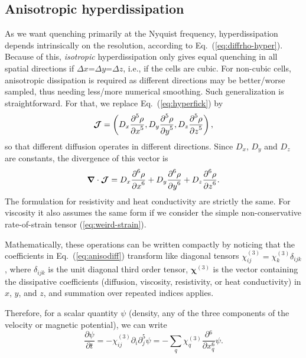 \documentclass[\mydriver,12pt,twoside,notitlepage,a4paper]{article}
\renewcommand{\vec}[1]{\mbox{\boldmath{$#1$}}}
\newcommand{\Div}     {\vec{\nabla}\cdot}
\newcommand{\pderiv}[2]{\frac{\partial #1}{\partial #2}}
\newcommand{\pderivn}[3]{\frac{{\partial{}}^{#3} #1}{{\partial #2}^{#3}}}
\begin{document}
\subsection{Anisotropic hyperdissipation}

As we want quenching primarily at the Nyquist frequency, hyperdissipation
depends intrinsically on the resolution, according to
Eq.~(\ref{eq:diffrho-hyper}).
Because of this, {\it isotropic} hyperdissipation only gives equal
quenching in all spatial directions if $\Delta x$=$\Delta y$=$\Delta z$,
i.e., if the cells are cubic.
For non-cubic cells, anisotropic dissipation is required as different
directions may be better/worse sampled, thus needing less/more numerical
smoothing.
Such generalization is straightforward. For that, we replace
Eq.~(\ref{eq:hyperfick}) by
\begin{equation}
  \label{eq:general-fick}
  \vec{\mathcal J}
    = \left(
        D_x \pderivn{\rho}{x}{5},
        D_y \pderivn{\rho}{y}{5},
        D_z \pderivn{\rho}{z}{5}
      \right),
\end{equation}
so that different diffusion operates in different directions.
Since $D_x$, $D_y$ and $D_z$ are constants, the divergence of this vector
is
\begin{equation}
  \label{eq:anisodiff}
  \Div\vec{\mathcal J}=D_x \pderivn{\rho}{x}{6}+
  D_y \pderivn{\rho}{y}{6}+
  D_z \pderivn{\rho}{z}{6}.
\end{equation}
The formulation for resistivity and heat conductivity are strictly the
same.
For viscosity it also assumes the same form if we consider the simple
non-conservative rate-of-strain tensor (\ref{eq:weird-strain}).

Mathematically, these operations can be written compactly by noticing that
the coefficients in Eq.~(\ref{eq:anisodiff}) transform like diagonal
tensors $\chi_{ij}^{(3)}=\chi_k^{(3)} \delta_{ijk}$, where $\delta_{ijk}$
is the unit diagonal third order tensor, $\mathbf{\chi}^{(3)}$ is the
vector containing the dissipative coefficients (diffusion, viscosity,
resistivity, or heat conductivity) in $x$, $y$, and $z$, and summation
over repeated indices applies.

Therefore, for a scalar quantity $\psi$ (density, any of the three components
of the velocity or magnetic potential), we can write
\begin{equation}
  \label{eq:component-6th}
  \pderiv{\psi}{t}
  = - \chi_{ij}^{(3)} {\partial{}}_i{\partial{}}_j^5\psi
  = -\sum_{q}^{} {\chi_q^{(3)} \frac{\partial{}^6}{\partial{x_q^6}}\psi}.
\end{equation}
\end{document}

